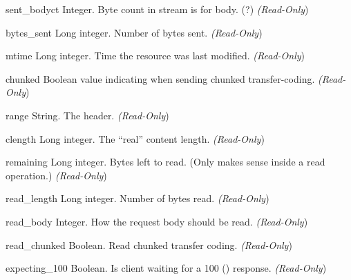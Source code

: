 \begin{memberdesc}[request]{sent_bodyct}
  Integer. Byte count in stream is for body. (?)
  \emph{(Read-Only})
\end{memberdesc}

\begin{memberdesc}[request]{bytes_sent}
  Long integer. Number of bytes sent.
  \emph{(Read-Only})
\end{memberdesc}

\begin{memberdesc}[request]{mtime}
  Long integer. Time the resource was last modified.
  \emph{(Read-Only})
\end{memberdesc}

\begin{memberdesc}[request]{chunked}
  Boolean value indicating when sending chunked transfer-coding.
  \emph{(Read-Only})
\end{memberdesc}

\begin{memberdesc}[request]{range}
  String. The  header.
  \emph{(Read-Only})
\end{memberdesc}

\begin{memberdesc}[request]{clength}
  Long integer. The ``real'' content length.
  \emph{(Read-Only})
\end{memberdesc}

\begin{memberdesc}[request]{remaining}
  Long integer. Bytes left to read. (Only makes sense inside a read
  operation.)
  \emph{(Read-Only})
\end{memberdesc}

\begin{memberdesc}[request]{read_length}
  Long integer. Number of bytes read.
  \emph{(Read-Only})
\end{memberdesc}

\begin{memberdesc}[request]{read_body}
  Integer. How the request body should be read.
  \emph{(Read-Only})
\end{memberdesc}

\begin{memberdesc}[request]{read_chunked}
  Boolean. Read chunked transfer coding.
  \emph{(Read-Only})
\end{memberdesc}

\begin{memberdesc}[request]{expecting_100}
  Boolean. Is client waiting for a 100 () response.
  \emph{(Read-Only})
\end{memberdesc}

